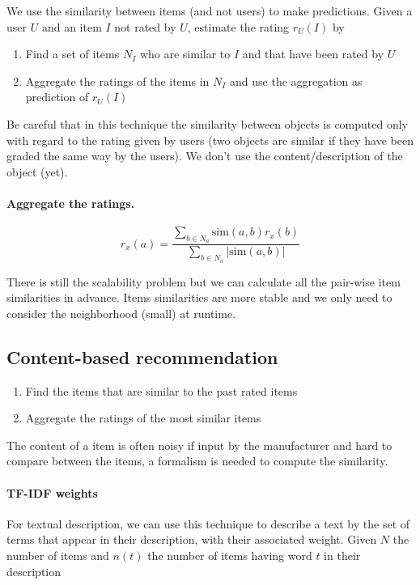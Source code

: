 We use the similarity between items (and not users) to make predictions. Given a user $U$ and an item $I$ not rated by $U$, estimate the rating $r_U(I)$ by

\begin{enumerate}
  \item Find a set of items $N_I$ who are similar to $I$ and that have been rated by $U$
  \item Aggregate the ratings of the items in $N_I$ and use the aggregation as prediction of $r_U(I)$
\end{enumerate}

Be careful that in this technique the similarity between objects is computed only with regard to the rating given by users (two objects are similar if they have been graded the same way by the users). We don't use the content/description of the object (yet).

\paragraph{Aggregate the ratings.}

\[
  r_x(a) = \frac{\sum_{b\in N_a} \text{sim}(a,b) r_x(b)}{\sum_{b\in N_a} |\text{sim}(a,b)|}
\]

There is still the scalability problem but we can calculate all the pair-wise item similarities in advance. Items similarities are more stable and we only need to consider the neighborhood (small) at runtime.

\subsection{Content-based recommendation}

\begin{enumerate}
  \item Find the items that are similar to the past rated items
  \item Aggregate the ratings of the most similar items
\end{enumerate}

The content of a item is often noisy if input by the manufacturer and hard to compare between the items, a formalism is needed to compute the similarity.

\paragraph{TF-IDF weights} For textual description, we can use this technique to describe a text by the set of terms that appear in their description, with their associated weight. Given $N$ the number of items and $n(t)$ the number of items having word $t$ in their description

